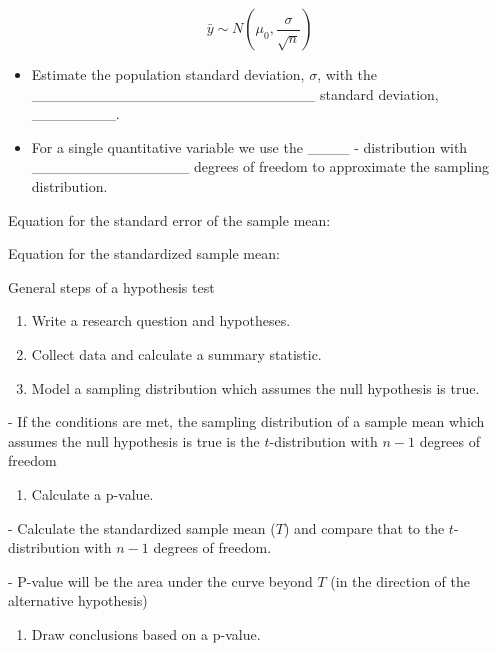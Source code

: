 \documentclass[
]{report}
\providecommand{\tightlist}{%
  \setlength{\itemsep}{0pt}\setlength{\parskip}{0pt}}
\newcommand{\rgi}{\hspace{24pt}}  %
\begin{document}
\[\bar{y} \sim N\left(\mu_0, \frac{\sigma}{\sqrt{n}}\right)\]

\begin{itemize}
\item
  Estimate the population standard deviation, \(\sigma\), with the \_\_\_\_\_\_\_\_\_\_\_\_\_\_\_\_\_\_\_\_\_\_\_\_\_\_\_ standard deviation, \_\_\_\_\_\_\_\_.
\item
  For a single quantitative variable we use the \_\_\_\_ - distribution with \_\_\_\_\_\_\_\_\_\_\_\_\_\_\_
  degrees of freedom to approximate the sampling distribution.
\end{itemize}


Equation for the standard error of the sample mean:

\vspace{0.5in}

Equation for the standardized sample mean:

\vspace{0.5in}

\newpage

General steps of a hypothesis test

\begin{enumerate}
\def\labelenumi{\arabic{enumi}.}
\item
  Write a research question and hypotheses.
\item
  Collect data and calculate a summary statistic.
\item
  Model a sampling distribution which assumes the null hypothesis is true.
\end{enumerate}

\rgi \rgi - If the conditions are met, the sampling distribution of a sample mean which assumes the null hypothesis is true is the \(t\)-distribution with \(n-1\) degrees of freedom

\begin{enumerate}
\def\labelenumi{\arabic{enumi}.}
\setcounter{enumi}{3}
\tightlist
\item
  Calculate a p-value.
\end{enumerate}

\rgi \rgi - Calculate the standardized sample mean (\(T\)) and compare that to the \(t\)-distribution with \(n-1\) degrees of freedom.

\rgi \rgi - P-value will be the area under the curve beyond \(T\) (in the direction of the alternative hypothesis)

\begin{enumerate}
\def\labelenumi{\arabic{enumi}.}
\setcounter{enumi}{4}
\tightlist
\item
  Draw conclusions based on a p-value.
\end{enumerate}
\end{document}
